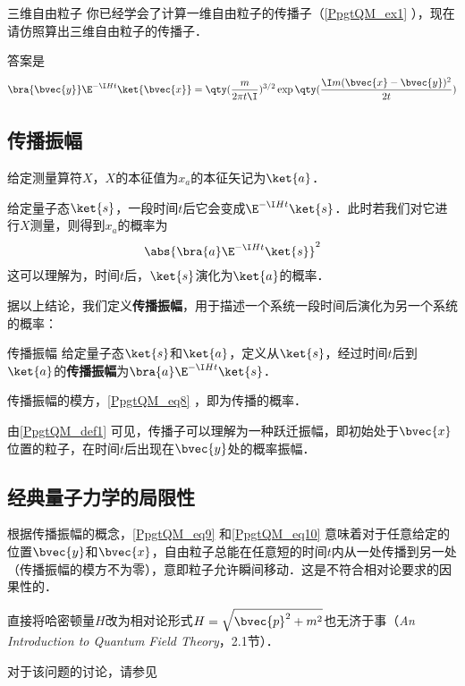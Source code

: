 \begin{exercise}{三维自由粒子}
你已经学会了计算一维自由粒子的传播子（\autoref{PpgtQM_ex1} ），现在请仿照算出三维自由粒子的传播子．

答案是
\begin{equation}\label{PpgtQM_eq10}
\bra{\bvec{y}}\E^{-\I H t}\ket{\bvec{x}} = \qty(\frac{m}{2\pi t\I})^{3/2}\exp\qty(\frac{\I m(\bvec{x}-\bvec{y})^2}{2t})
\end{equation}
\end{exercise}









\subsection{传播振幅}


给定测量算符$X$，$X$的本征值为$x_a$的本征矢记为$\ket{a}$．

给定量子态$\ket{s}$，一段时间$t$后它会变成$\E^{-\I Ht}\ket{s}$．此时若我们对它进行$X$测量，则得到$x_a$的概率为
\begin{equation}\label{PpgtQM_eq8}
\abs{\bra{a}\E^{-\I Ht}\ket{s}}^2
\end{equation}
这可以理解为，时间$t$后，$\ket{s}$演化为$\ket{a}$的概率．

据以上结论，我们定义\textbf{传播振幅}，用于描述一个系统一段时间后演化为另一个系统的概率：

\begin{definition}{传播振幅}\label{PpgtQM_def1}
给定量子态$\ket{s}$和$\ket{a}$，定义从$\ket{s}$，经过时间$t$后到$\ket{a}$的\textbf{传播振幅}为$\bra{a}\E^{-\I Ht}\ket{s}$．

传播振幅的模方，\autoref{PpgtQM_eq8} ，即为传播的概率．
\end{definition}

由\autoref{PpgtQM_def1} 可见，传播子可以理解为一种跃迁振幅，即初始处于$\bvec{x}$位置的粒子，在时间$t$后出现在$\bvec{y}$处的概率振幅．




\subsection{经典量子力学的局限性}

根据传播振幅的概念，\autoref{PpgtQM_eq9} 和\autoref{PpgtQM_eq10} 意味着对于任意给定的位置$\bvec{y}$和$\bvec{x}$，自由粒子总能在任意短的时间$t$内从一处传播到另一处（传播振幅的模方不为零），意即粒子允许瞬间移动．这是不符合相对论要求的因果性的．

直接将哈密顿量$H$改为相对论形式$H=\sqrt{\bvec{p}^2+m^2}$也无济于事（\textsl{An Introduction to Quantum Field Theory}\cite{Peskin}，2.1节）．

对于该问题的讨论，请参见














